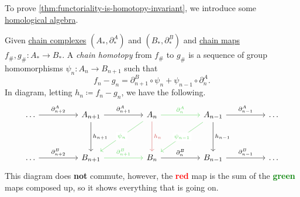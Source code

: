 To prove \autoref{thm:functoriality-is-homotopy-invariant}, we introduce some \hyperref[sec:homological-algebra]{homological algebra}.

\begin{definition}\label{def:chain-homotopy}
	Given \hyperref[def:chain-complex]{chain complexes} \((A_\ast, \partial ^A_\ast)\) and \((B_\ast, \partial^B_\ast)\)
	and \hyperref[def:chain-map]{chain maps} \(f_\#, g_\# \colon  A_\ast \to B_\ast\). A \emph{chain homotopy} from
	\(f_\#\) to \(g_\#\) is a sequence of group homomorphisms \(\psi_n\colon A_n \to B_{n + 1}\) such that
	\[
		f_n - g_n = \partial ^B_{n + 1} \circ \psi_n + \psi_{n - 1} \circ \partial _n^A.
	\]
	In diagram, letting \(h_n \coloneqq f_n - g_n\), we have the following.
	\[
		\begin{tikzcd}
			\ldots && {A_{n+1}} && {A_{n}} && {A_{n-1}} && \ldots \\
			\\
			\ldots && {B_{n+1}} && {B_{n}} && {B_{n-1}} && \ldots
			\arrow["{\partial^A_{n-1}}", from=1-7, to=1-9]
			\arrow["{\partial^B_{n-1}}", from=3-7, to=3-9]
			\arrow["{\partial^A_{n}}", color={rgb,255:red,92;green,214;blue,92}, from=1-5, to=1-7]
			\arrow["{\partial^B_{n}}", from=3-5, to=3-7]
			\arrow["{\partial^B_{n+1}}", color={rgb,255:red,92;green,214;blue,92}, from=3-3, to=3-5]
			\arrow["{\partial^A_{n+2}}", from=1-1, to=1-3]
			\arrow["{\partial^B_{n+2}}", from=3-1, to=3-3]
			\arrow["{h_{n+1}}", from=1-3, to=3-3]
			\arrow["{h_{n}}", color={rgb,255:red,214;green,92;blue,92}, from=1-5, to=3-5]
			\arrow["{h_{n-1}}", from=1-7, to=3-7]
			\arrow["{\partial^A_{n+1}}", from=1-3, to=1-5]
			\arrow["{\psi_n}"{description}, color={rgb,255:red,92;green,214;blue,92}, from=1-5, to=3-3]
			\arrow["{\psi_{n-1}}"{description}, color={rgb,255:red,92;green,214;blue,92}, from=1-7, to=3-5]
		\end{tikzcd}
	\]
	This diagram does \textbf{not} commute, however, the \textbf{\textcolor{red}{red}} map is the sum of the
	\textbf{\textcolor{green}{green}} maps composed up, so it shows everything that is going on.
\end{definition}

